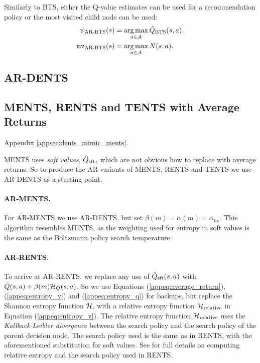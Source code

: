     Similarly to BTS, either the Q-value estimates can be used for a recommendation policy or the most visited child node can be used:
    \begin{align}
        {\psi_{{\textnormal{AR-BTS}}}}(s) &= \operatorname*{arg\,max}_{a\in\mathcal{A}}{\hat{Q}_{{\textnormal{BTS}}}}(s,a), \\
        {\textup{\texttt{mv}}_{{\textnormal{AR-BTS}}}}(s) &= \operatorname*{arg\,max}_{a\in\mathcal{A}} N(s,a).
    \end{align}


\subsection{AR-DENTS}
\label{appsec:ardents}



\subsection{MENTS, RENTS and TENTS with Average Returns} 
\label{appsec:arments}


     Appendix \ref{appsec:dents_mimic_ments}.


    MENTS uses \textit{soft values}, $\hat{Q}_{\textnormal{sft}}$, which are not obvious how to replace with average returns. So to produce the AR variants of MENTS, RENTS and TENTS we use AR-DENTS as a starting point. 

    \paragraph{AR-MENTS.} For AR-MENTS we use AR-DENTS, but set $\beta(m)=\alpha(m)=\alpha_{\text{fix}}$. This algorithm resembles MENTS, as the weighting used for entropy in soft values is the same as the Boltzmann policy search temperature. 

    \paragraph{AR-RENTS.} To arrive at AR-RENTS, we replace any use of $\hat{Q}_{\textnormal{sft}}(s,a)$ with $\bar{Q}(s,a)+\beta(m)\mathcal{H}_Q(s,a)$. So we use Equations (\ref{appeq:average_return}), (\ref{appeq:entropy_v}) and (\ref{appeq:entropy_q}) for backups, but replace the Shannon entropy function $\mathcal{H}$, with a relative entropy function $\mathcal{H}_{\textnormal{relative}}$ in Equation (\ref{appeq:entropy_v}). The relative entropy function $\mathcal{H}_{\textnormal{relative}}$ uses the \textit{Kullback-Leibler divergence} between the search policy and the search policy of the parent decision node. The search policy used is the same as in RENTS, with the aforementioned substitution for soft values. See %
        for full details on computing relative entropy and the search policy used in RENTS. 

